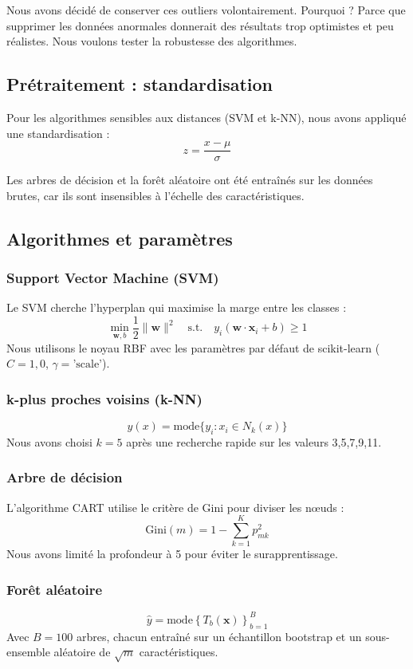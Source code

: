 \documentclass[conference]{IEEEtran}
\begin{document}
Nous avons décidé de conserver ces outliers volontairement. Pourquoi ? Parce que supprimer les données anormales donnerait des résultats trop optimistes et peu réalistes. Nous voulons tester la robustesse des algorithmes.

\subsection{Prétraitement : standardisation}

Pour les algorithmes sensibles aux distances (SVM et k-NN), nous avons appliqué une standardisation :
\[
z = \frac{x - \mu}{\sigma}
\]

Les arbres de décision et la forêt aléatoire ont été entraînés sur les données brutes, car ils sont insensibles à l'échelle des caractéristiques.

\subsection{Algorithmes et paramètres}

\subsubsection{Support Vector Machine (SVM)}
Le SVM cherche l'hyperplan qui maximise la marge entre les classes :
\[
\min_{\mathbf{w}, b} \frac{1}{2} \|\mathbf{w}\|^2 \quad \text{s.t.} \quad y_i(\mathbf{w} \cdot \mathbf{x}_i + b) \geq 1
\]
Nous utilisons le noyau RBF avec les paramètres par défaut de scikit-learn (\(C=1,0\), \(\gamma = \text{'scale'}\)).

\subsubsection{k-plus proches voisins (k-NN)}
\[
\hat{y}(x) = \text{mode} \{ y_i : x_i \in N_k(x) \}
\]
Nous avons choisi \(k=5\) après une recherche rapide sur les valeurs 3,5,7,9,11.

\subsubsection{Arbre de décision}
L'algorithme CART utilise le critère de Gini pour diviser les nœuds :
\[
\text{Gini}(m) = 1 - \sum_{k=1}^{K} p_{mk}^2
\]
Nous avons limité la profondeur à 5 pour éviter le surapprentissage.

\subsubsection{Forêt aléatoire}
\[
\hat{y} = \text{mode} \left\{ T_b(\mathbf{x}) \right\}_{b=1}^{B}
\]
Avec \(B=100\) arbres, chacun entraîné sur un échantillon bootstrap et un sous-ensemble aléatoire de \(\sqrt{m}\) caractéristiques.
\end{document}
